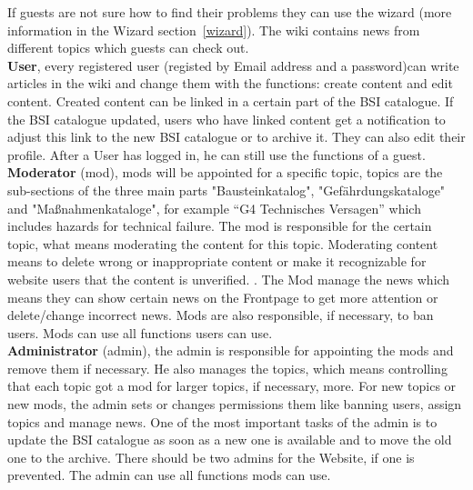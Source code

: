 If guests are not sure how to find their problems they can use the wizard (more information in the Wizard section~\ref{wizard}). 
The wiki contains news from different topics which guests can check out.
\\
\textbf{User}, every registered user (registed by Email address and a password)can write articles in the wiki and change them with the functions: create content and edit content. Created content can be linked in a certain part of the BSI catalogue. If the BSI catalogue updated, users who have linked content get a notification to adjust this link to the new BSI catalogue or to archive it.
They can also edit their profile. 
After a User has logged in, he can still use the functions of a guest.
\\
\textbf{Moderator} (mod), mods will be appointed for a specific topic, topics are the sub-sections of the three main parts "Bausteinkatalog", "Gefährdungskataloge" and "Maßnahmenkataloge", for example “G4 Technisches Versagen” which includes hazards for technical failure. The mod is responsible for the certain topic, what means moderating the content for this topic. Moderating content means to delete wrong or inappropriate content or make it recognizable for website users that the content is unverified.  .  
The Mod manage the news which means they can show certain news on the Frontpage to get more attention or delete/change incorrect news. Mods are also responsible, if necessary, to ban users. 
Mods can use all functions users can use.
\\
\textbf{Administrator} (admin), the admin is responsible for appointing the mods and remove them if necessary. He also manages the topics, which means controlling that each topic got a mod for larger topics, if necessary, more. 
For new topics or new mods, the admin sets or changes permissions them like banning users, assign topics and manage news. 
One of the most important tasks of the admin is to update the BSI catalogue as soon as a new one is available and to move the old one to the archive.  There should be two admins for the Website, if one is prevented.
The admin can use all functions mods can use. 


